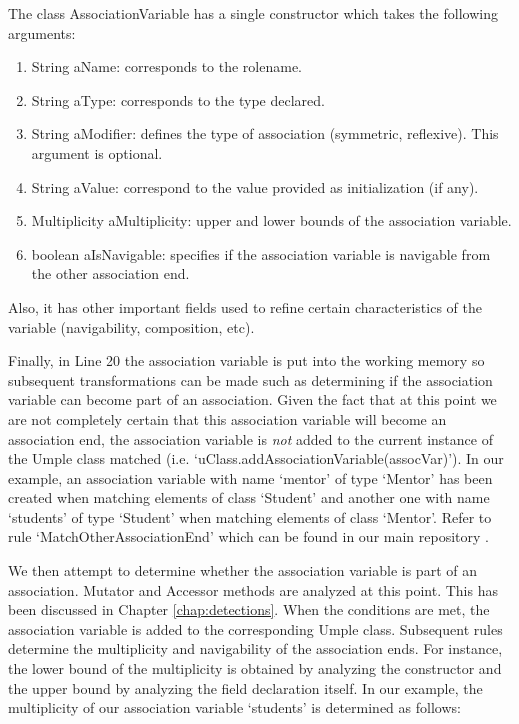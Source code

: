 The class AssociationVariable has a single constructor which takes the following arguments:

\begin{enumerate}
\item String aName: corresponds to the rolename.
\item String aType: corresponds to the type declared.
\item String aModifier: defines the type of association (symmetric, reflexive). This argument is optional.
\item String aValue: correspond to the value provided as initialization (if any).
\item Multiplicity aMultiplicity: upper and lower bounds of the association variable.
\item boolean aIsNavigable: specifies if the association variable is navigable from the other association end.
\end{enumerate}

Also, it has other important fields used to refine certain characteristics of the variable (navigability, composition, etc).

Finally, in Line 20 the association variable is put into the working memory so subsequent transformations can be made such as determining if the association variable can become part of an association. Given the fact that at this point we are not completely certain that this association variable will become an association end, the association variable is \textit{not} added to the current instance of the Umple class matched (i.e. `uClass.addAssociationVariable(assocVar)'). In our example, an association variable with name `mentor' of type `Mentor' has been created when matching elements of class `Student' and another one with name `students' of type `Student' when matching elements of class `Mentor'. Refer to rule  `MatchOtherAssociationEnd' which can be found in our main repository \cite{MappingRulesRepository}. 

We then attempt to determine whether the association variable is part of an association. Mutator and Accessor methods are analyzed at this point. This has been discussed in Chapter \ref{chap:detections}.
When the conditions are met, the association variable is added to the corresponding Umple class. Subsequent rules determine the multiplicity and navigability of the association ends. For instance, the lower bound of the multiplicity is obtained by analyzing the constructor and the upper bound by analyzing the field declaration itself. In our example, the multiplicity of our association variable `students' is determined as follows:

